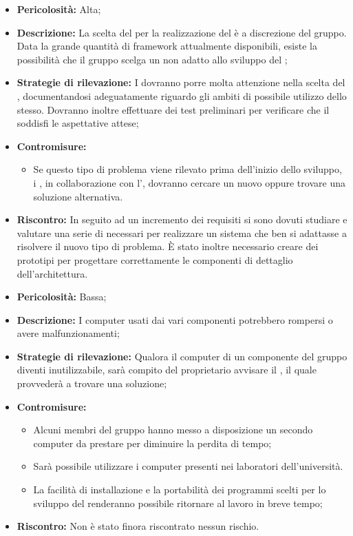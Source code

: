 \begin{itemize}
\item \textbf{Pericolosità:} Alta;
\item \textbf{Descrizione:} La scelta del  per la realizzazione del  è a discrezione del gruppo. Data la grande quantità di framework attualmente disponibili, esiste la possibilità che il gruppo scelga un  non adatto allo sviluppo del ;
\item \textbf{Strategie di rilevazione:} I \rPs dovranno porre molta attenzione nella scelta del , documentandosi adeguatamente riguardo gli ambiti di possibile utilizzo dello stesso. Dovranno inoltre effettuare dei test preliminari per verificare che il  soddisfi le aspettative attese;
\item \textbf{Contromisure:}
\begin{itemize}
\item Se questo tipo di problema viene rilevato prima dell'inizio dello sviluppo, i \rPs, in collaborazione con l'\rAP, dovranno cercare un nuovo  oppure trovare una soluzione alternativa.
\end{itemize}
\item \textbf{Riscontro:} In seguito ad un incremento dei requisiti si sono dovuti studiare e valutare una serie di  necessari per realizzare un sistema che ben si adattasse a risolvere il nuovo tipo di problema. \`E stato inoltre necessario creare dei prototipi per progettare correttamente le componenti di dettaglio dell'architettura.
\end{itemize}
\label{r_hw}
\begin{itemize}
\item \textbf{Pericolosità:} Bassa;
\item \textbf{Descrizione:} I computer usati dai vari componenti potrebbero rompersi o avere malfunzionamenti;
\item \textbf{Strategie di rilevazione:} Qualora il computer di un componente del gruppo diventi inutilizzabile, sarà compito del proprietario avvisare il \rRP, il quale provvederà a trovare una soluzione;
\item \textbf{Contromisure:}
\begin{itemize}
\item Alcuni membri del gruppo hanno messo a disposizione un secondo computer da prestare per diminuire la perdita di tempo;
\item Sarà possibile utilizzare i computer presenti nei laboratori dell'università. \\
\item La facilità di installazione e la portabilità dei programmi scelti per lo sviluppo del  renderanno possibile ritornare al lavoro in breve tempo;
\end{itemize}
\item \textbf{Riscontro:} Non è stato finora riscontrato nessun rischio.
\end{itemize}
